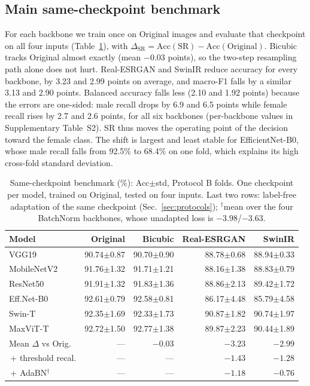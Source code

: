 \documentclass[conference]{IEEEtran}
\begin{document}
\subsection{Main same-checkpoint benchmark}\label{sec:main}
For each backbone we train once on Original images and evaluate that checkpoint on all four inputs (Table~\ref{tab:main}), with $\Delta_{\text{SR}} = \text{Acc}(\text{SR}) - \text{Acc}(\text{Original})$. Bicubic tracks Original almost exactly (mean $-0.03$ points), so the two-step resampling path alone does not hurt. Real-ESRGAN and SwinIR reduce accuracy for every backbone, by 3.23 and 2.99 points on average, and macro-F1 falls by a similar 3.13 and 2.90 points. Balanced accuracy falls less (2.10 and 1.92 points) because the errors are one-sided: male recall drops by 6.9 and 6.5 points while female recall rises by 2.7 and 2.6 points, for all six backbones (per-backbone values in Supplementary Table~S2). SR thus moves the operating point of the decision toward the female class. The shift is largest and least stable for EfficientNet-B0, whose male recall falls from 92.5\% to 68.4\% on one fold, which explains its high cross-fold standard deviation.

\begin{table}[t]
\centering
\caption{Same-checkpoint benchmark (\%): Acc$\pm$std, Protocol B folds. One checkpoint per model, trained on Original, tested on four inputs. Last two rows: label-free adaptation of the same checkpoint (Sec.~\ref{sec:protocols}); $^\dagger$mean over the four BatchNorm backbones, whose unadapted loss is $-3.98$/$-3.63$.}
\label{tab:main}
\small
\footnotesize
\setlength{\tabcolsep}{3pt}
\begin{tabular}{@{}lrrrr@{}}
\toprule
Model & Original & Bicubic & Real-ESRGAN & SwinIR \\
\midrule
VGG19       & 90.74$\pm$0.87 & 90.70$\pm$0.90 & 88.78$\pm$0.68 & 88.94$\pm$0.33 \\
MobileNetV2 & 91.76$\pm$1.32 & 91.71$\pm$1.21 & 88.16$\pm$1.38 & 88.83$\pm$0.79 \\
ResNet50    & 91.91$\pm$1.32 & 91.83$\pm$1.36 & 88.86$\pm$2.13 & 89.42$\pm$1.72 \\
Eff.Net-B0  & 92.61$\pm$0.79 & 92.58$\pm$0.81 & 86.17$\pm$4.48 & 85.79$\pm$4.58 \\
Swin-T      & 92.35$\pm$1.69 & 92.33$\pm$1.73 & 90.87$\pm$1.82 & 90.74$\pm$1.97 \\
MaxViT-T    & 92.72$\pm$1.50 & 92.77$\pm$1.38 & 89.87$\pm$2.23 & 90.44$\pm$1.89 \\
\midrule
Mean $\Delta$ vs Orig. & --- & $-0.03$ & $-3.23$ & $-2.99$ \\
\,+ threshold recal. & --- & --- & $-1.43$ & $-1.28$ \\
\,+ AdaBN$^\dagger$ & --- & --- & $-1.18$ & $-0.76$ \\
\bottomrule
\end{tabular}
\end{table}
\end{document}
